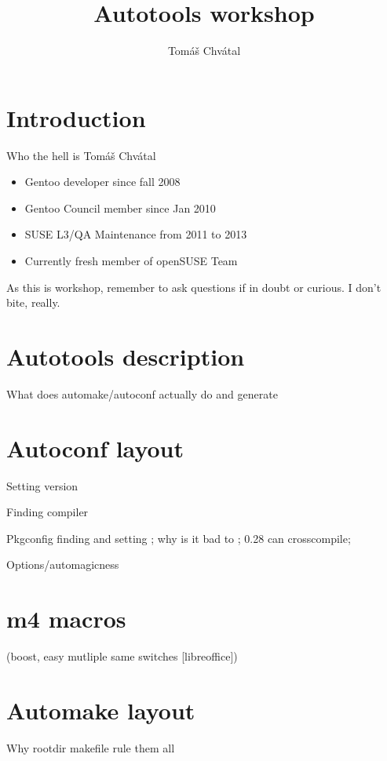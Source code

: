 \documentclass{beamer}
\author{Tom\'{a}\v{s} Chv\'{a}tal\newline {\small openSUSE Team}}
\title{Autotools workshop}
\begin{document}
\begin{frame}[t,plain]
\titlepage
\end{frame}

\section{Introduction}

\begin{frame}{Who the hell is Tomáš Chvátal}
	\begin{itemize}
	\item Gentoo developer since fall 2008
	\item Gentoo Council member since Jan 2010
	\item SUSE L3/QA Maintenance from 2011 to 2013
	\item Currently fresh member of openSUSE Team
	\end{itemize}
	\begin{center}As this is workshop, remember to ask questions if in doubt or curious. I don't bite, really.\end{center}
\end{frame}

\section{Autotools description}

What does automake/autoconf actually do and generate

\section{Autoconf layout}

Setting version

Finding compiler

Pkgconfig finding and setting ; why is it bad to ; 0.28 can crosscompile;

Options/automagicness

\section{m4 macros}
(boost, easy mutliple same switches [libreoffice])

\section{Automake layout}

Why rootdir makefile rule them all
\end{document}
